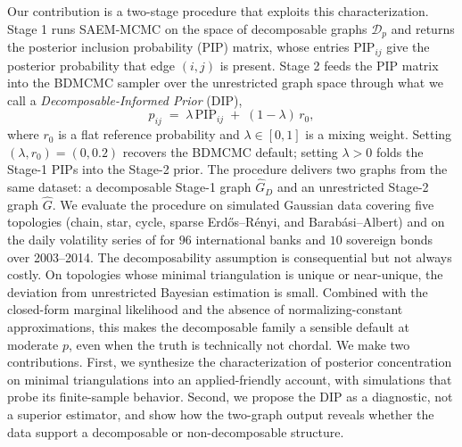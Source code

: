 Our contribution is a two-stage procedure that exploits this characterization. Stage 1 runs SAEM-MCMC on the space of decomposable graphs $\mathcal{D}_p$ and returns the posterior inclusion probability (PIP) matrix, whose entries $\text{PIP}_{ij}$ give the posterior probability that edge $(i,j)$ is present. Stage 2 feeds the PIP matrix into the BDMCMC sampler over the unrestricted graph space \parencite{mohammadi2015bdgraph} through what we call a \textit{Decomposable-Informed Prior} (DIP),
\[
    p_{ij} \;=\; \lambda\,\text{PIP}_{ij} \;+\; (1-\lambda)\, r_0,
\]
where $r_0$ is a flat reference probability and $\lambda \in [0,1]$ is a mixing weight. Setting $(\lambda, r_0) = (0, 0.2)$ recovers the BDMCMC default; setting $\lambda > 0$ folds the Stage-1 PIPs into the Stage-2 prior. The procedure delivers two graphs from the same dataset: a decomposable Stage-1 graph $\hat G_D$ and an unrestricted Stage-2 graph $\hat G$. We evaluate the procedure on simulated Gaussian data covering five topologies (chain, star, cycle, sparse Erd\H{o}s--R\'enyi, and Barab\'asi--Albert) and on the daily volatility series of \textcite{demirer2018estimating} for $96$ international banks and $10$ sovereign bonds over 2003--2014. The decomposability assumption is consequential but not always costly. On topologies whose minimal triangulation is unique or near-unique, the deviation from unrestricted Bayesian estimation is small. Combined with the closed-form marginal likelihood and the absence of normalizing-constant approximations, this makes the decomposable family a sensible default at moderate $p$, even when the truth is technically not chordal. 
We make two contributions. First, we synthesize the \textcite{niu2020bayesian} characterization of posterior concentration on minimal triangulations into an applied-friendly account, with simulations that probe its finite-sample behavior. Second, we propose the DIP as a diagnostic, not a superior estimator, and show how the two-graph output reveals whether the data support a decomposable or non-decomposable structure. 

